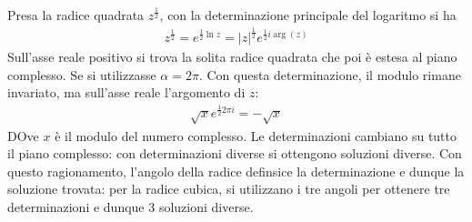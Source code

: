 \documentclass[a4paper, oneside]{article}
\begin{document}
\begin{example}
    Presa la radice quadrata $z^{\frac{1}{2}}$, con la determinazione 
    principale del logaritmo si ha 
    \begin{gather*}
        z^{\frac{1}{2}} = e^{\frac{1}{2}\ln z} = \left| z \right|^{\frac{1}{2}}e^{\frac{1}{2} i\arg(z)} 
    \end{gather*}
    Sull'asse reale positivo si trova la solita radice quadrata che poi è estesa al 
    piano complesso. Se si utilizzasse $\alpha = 2\pi$. Con questa determinazione, 
    il modulo rimane invariato, ma sull'asse reale l'argomento di $z$:
    \begin{gather*}
        \sqrt{x} e^{\frac{1}{2}2\pi i} = -\sqrt{x}   
    \end{gather*}
    DOve $x$ è il modulo del numero complesso. Le determinazioni cambiano su tutto il piano complesso: con determinazioni 
    diverse si ottengono soluzioni diverse. Con questo ragionamento, l'angolo della radice definsice
    la determinazione e dunque la soluzione trovata: per la radice cubica, si utilizzano i tre angoli 
    per ottenere tre determinazioni e dunque 3 soluzioni diverse.
\end{example}
\end{document}

